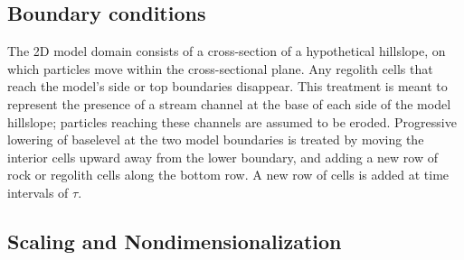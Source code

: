 \documentclass[esurf, manuscript]{copernicus}
\begin{document}
\subsection{Boundary conditions}

The 2D model domain consists of a cross-section of a hypothetical hillslope, on which particles move within the cross-sectional plane. Any regolith cells that reach the model's side or top boundaries disappear. This treatment is meant to represent the presence of a stream channel at the base of each side of the model hillslope; particles reaching these channels are assumed to be eroded. Progressive lowering of baselevel at the two model boundaries is treated by moving the interior cells upward away from the lower boundary, and adding a new row of rock or regolith cells along the bottom row. A new row of cells is added at time intervals of $\tau$.


\subsection{Scaling and Nondimensionalization}
\end{document}
